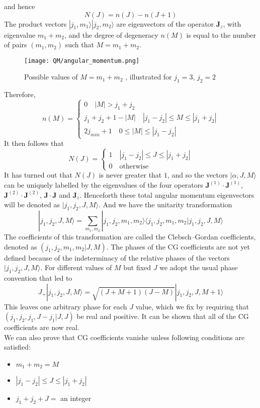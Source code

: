 and hence
\[N(J) = n(J) - n(J+1)\]
The product vectors $|j_1,m_1\rangle |j_2,m_2\rangle$ are eigenvectors of the operator $\bm{J}_z$, with eigenvalue $m_1+m_2$, and the degree of degeneracy $n(M)$ is equal to the number of pairs $(m_1,m_2)$ such that $M=m_1+m_2$.
\begin{figure}[!h]
	\centering
	\texttt{[image: QM/angular\_momentum.png]}
	\caption{Possible values of $M=m_1+m_2$ , illustrated for $j_1=3$, $j_2=2$}
\end{figure}
Therefore,
\[n(M)=\begin{cases} 0 \quad |M| > j_1 + j_2\\ j_1+j_2+1-|M|\quad |j_1-j_2| \leq M \leq |j_1+j_2|\\ 2j_{min}+1 \quad 0 \leq |M|\leq |j_1-j_2|\end{cases} \]
It then follows that
\[N(J)=\begin{cases} 1 \quad |j_1-j_2| \leq J \leq |j_1+j_2|\\ 0 \quad \mbox{otherwise}\end{cases} \]
It has turned out that $N(J)$ is never greater that $1$, and so the vectors $|\alpha, J, M \rangle$ can be uniquely labelled by the eigenvalues of the four operators $\bm{J}^{(1)}\cdot\bm{J}^{(1)}$, $\bm{J}^{(2)}\cdot\bm{J}^{(2)}$, $\bm{J}\cdot\bm{J}$ and $\bm{J}_z$. Henceforth these total angular momentum
eigenvectors will be denoted as $|j_1,j_2,J,M\rangle$. And we have the unitarity transformation 
\[|j_1,j_2,J,M\rangle = \sum_{m_1,m_2} |j_1,j_2,m_1,m_2\rangle \langle j_1,j_2,m_1,m_2 | j_1,j_2,J,M\rangle\]
The coefficients of this transformation are called the Clebsch–Gordan coefficients, denoted as $(j_1,j_2,m_1,m_2|J,M)$.
The phases of the CG coefficients are not yet defined because of the indeterminacy of the relative phases of the vectors $|j_1,j_2,J,M\rangle$. For different values of $M$ but fixed $J$ we adopt the usual phase convention that led to
\[J_+ |j_1,j_2,J,M\rangle = \sqrt{(J+M+1)(J-M)} |j_1,j_2,J,M+1\rangle\]
This leaves one arbitrary phase for each $J$ value, which we fix by requiring that $(j_1,j_2,j_1,J-j_1|J,J)$ be real and positive. It can be shown that all of the CG coefficients are now real.\\
We can also prove that CG coefficients vanishe unless following conditions are satisfied:
\begin{itemize}
\item $m_1+m_2=M$
\item $|j_1-j_2| \leq J \leq |j_1+j_2|$
\item $j_1+j_2+J =$ an integer
\end{itemize}
